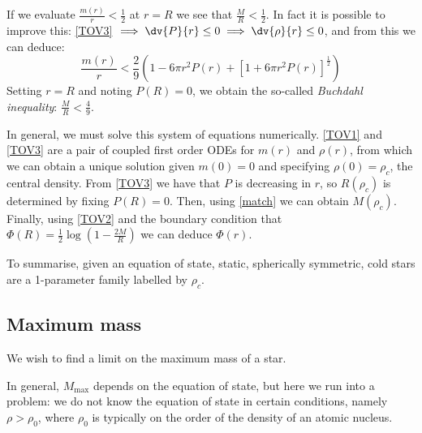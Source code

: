 \documentclass{jknotes}
\begin{document}
\begin{description}
        If we evaluate \(\frac{m(r)}{r}<\frac{1}{2}\) at \(r=R\) we see that \(\frac{M}{R} < \frac{1}{2}\). In fact it is possible to improve this: \eqref{TOV3} \(\implies\dv{P}{r}\le0\implies\dv{\rho}{r}\le0\), and from this we can deduce:
        \begin{equation}
            \frac{m(r)}{r} < \frac{2}{9}\left( 1 - 6\pi r^2P(r) + \left[ 1 + 6\pi r^2P(r) \right]^{\frac{1}{2}} \right)
            \tag{\(\dagger\)}
            \label{buchdahl}
        \end{equation}
        Setting \(r = R\) and noting \(P(R) = 0\), we obtain the so-called \emph{Buchdahl inequality}: \(\frac{M}{R}<\frac{4}{9}\).

        In general, we must solve this system of equations numerically. \eqref{TOV1} and \eqref{TOV3} are a pair of coupled first order ODEs for \(m(r)\) and \(\rho(r)\), from which we can obtain a unique solution given \(m(0)=0\) and specifying \(\rho(0) = \rho_c\), the central density. From \eqref{TOV3} we have that \(P\) is decreasing in \(r\), so \(R(\rho_c)\) is determined by fixing \(P(R) = 0\). Then, using \eqref{match} we can obtain \(M(\rho_c)\). Finally, using
        \eqref{TOV2} and the boundary condition that \(\Phi(R) = \frac{1}{2}\log\left( 1 - \frac{2M}{R} \right)\) we can deduce \(\Phi(r)\). 

        To summarise, given an equation of state, static, spherically symmetric, cold stars are a 1-parameter family labelled by \(\rho_c\).
\end{description}

\subsection{Maximum mass}
We wish to find a limit on the maximum mass of a star.
\begin{figure}[H]
    \centering
\end{figure}
In general, \(M_{\text{max}}\) depends on the equation of state, but here we run into a problem: we do not know the equation of state in certain conditions, namely \(\rho>\rho_0\), where \(\rho_0\) is typically on the order of the density of an atomic nucleus.
\end{document}
